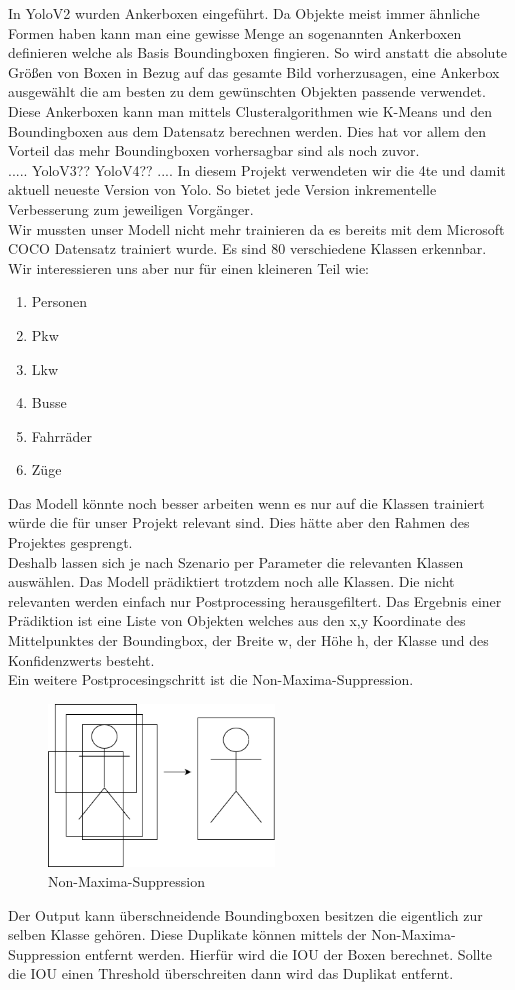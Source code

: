 \documentclass[conference]{IEEEtran}
\begin{document}
	In YoloV2 wurden Ankerboxen eingeführt. Da Objekte meist immer ähnliche Formen haben kann man eine gewisse Menge an sogenannten Ankerboxen definieren welche als Basis Boundingboxen fingieren. So wird anstatt die absolute Größen von Boxen in Bezug auf das gesamte Bild vorherzusagen, eine Ankerbox ausgewählt die am besten zu dem gewünschten Objekten passende verwendet. Diese Ankerboxen kann man mittels Clusteralgorithmen wie K-Means und den Boundingboxen aus dem Datensatz berechnen werden. Dies hat vor allem den Vorteil das mehr Boundingboxen vorhersagbar sind als noch zuvor. \cite{b3}\\
	.....
	YoloV3??
	YoloV4??
	....
	In diesem Projekt verwendeten wir die 4te und damit aktuell neueste Version von Yolo\cite{b2}. So bietet jede Version inkrementelle Verbesserung zum jeweiligen Vorgänger.\\
	Wir mussten unser Modell nicht mehr trainieren da es bereits mit dem Microsoft COCO Datensatz trainiert wurde. Es sind 80 verschiedene Klassen erkennbar. Wir interessieren uns aber nur für einen kleineren Teil wie:
	\begin{enumerate}
		\item Personen
		\item Pkw
		\item Lkw
		\item Busse
		\item Fahrräder
		\item Züge
	\end{enumerate}
	Das Modell könnte noch besser arbeiten wenn es nur auf die Klassen trainiert würde die für unser Projekt relevant sind. Dies hätte aber den Rahmen des Projektes gesprengt.\\
	Deshalb lassen sich je nach Szenario per Parameter die relevanten Klassen auswählen. Das Modell prädiktiert trotzdem noch alle Klassen. Die nicht relevanten werden einfach nur Postprocessing herausgefiltert. Das Ergebnis einer Prädiktion ist eine Liste von Objekten welches aus den x,y Koordinate des Mittelpunktes der Boundingbox, der Breite w, der Höhe h, der Klasse und des Konfidenzwerts besteht.\\
	Ein weitere Postprocesingschritt ist die Non-Maxima-Suppression.
	\begin{figure}[!h]
		\begin{center}
			\includegraphics[width=6cm]{Media/NMS.png}
			\caption{Non-Maxima-Suppression}
			\label{NMS}
		\end{center}
	\end{figure}
	Der Output kann überschneidende Boundingboxen besitzen die eigentlich zur selben Klasse gehören. Diese Duplikate können mittels der Non-Maxima-Suppression entfernt werden. Hierfür wird die IOU der Boxen berechnet. Sollte die IOU einen Threshold überschreiten dann wird das Duplikat entfernt.
	
\end{document}
